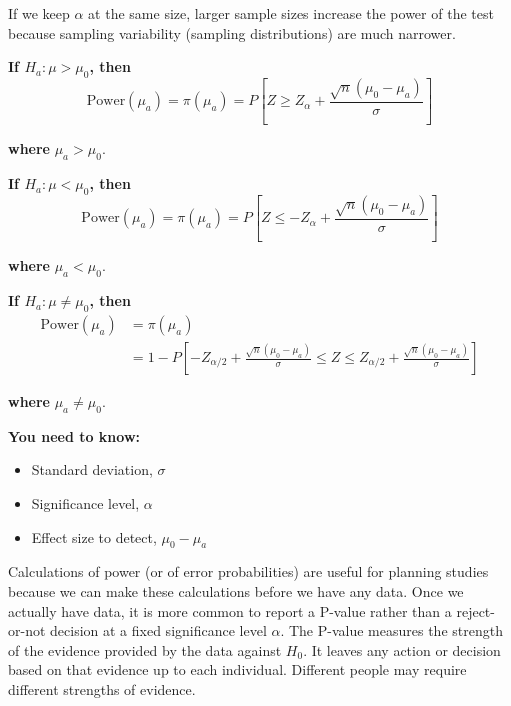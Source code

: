 If we keep \( \alpha \) at the same size, larger sample sizes increase the power of the test because sampling variability (sampling distributions) are much narrower.
\begin{tcolorbox}[colback=yellow!5, colframe=yellow!50!black,
  title={Power Formulas},
  sharp corners, boxrule=0.4pt, width=\textwidth, breakable]

\textbf{If $H_a : \mu > \mu_0$, then}
\[
\text{Power}(\mu_a) = \pi(\mu_a) = P \left[ Z \geq Z_{\alpha} + \frac{\sqrt{n}(\mu_0 - \mu_a)}{\sigma} \right]
\]

\textbf{where } $\mu_a > \mu_0$.

\vspace{1em}

\textbf{If $H_a : \mu < \mu_0$, then}
\[
\text{Power}(\mu_a) = \pi(\mu_a) = P \left[ Z \leq -Z_{\alpha} + \frac{\sqrt{n}(\mu_0 - \mu_a)}{\sigma} \right]
\]

\textbf{where } $\mu_a < \mu_0$.

\vspace{1em}

\textbf{If $H_a : \mu \ne \mu_0$, then}
\[
\begin{aligned}
\text{Power}(\mu_a) &= \pi(\mu_a) \\
&= 1 - P \left[ -Z_{\alpha/2} + \frac{\sqrt{n}(\mu_0 - \mu_a)}{\sigma} \leq Z \leq Z_{\alpha/2} + \frac{\sqrt{n}(\mu_0 - \mu_a)}{\sigma} \right]
\end{aligned}
\]

\textbf{where } $\mu_a \ne \mu_0$.

\vspace{0.5em}
\textbf{You need to know:}
\begin{itemize}
  \item Standard deviation, $\sigma$
  \item Significance level, $\alpha$
  \item Effect size to detect, $\mu_0 - \mu_a$
\end{itemize}

\end{tcolorbox}
Calculations of power (or of error probabilities) are useful for planning studies because we can make these calculations before we have any data. Once we actually have data, it is more common to report a P-value rather than a reject-or-not decision at a fixed significance level $\alpha$. The P-value measures the strength of the evidence provided by the data against $H_0$. It leaves any action or decision based on that evidence up to each individual. Different people may require different strengths of evidence.






